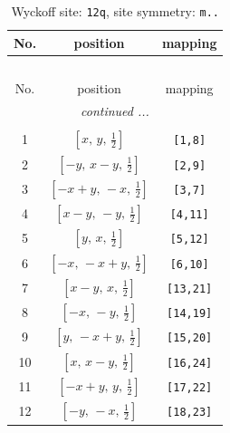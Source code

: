 \documentclass[fleqn,8pt]{jsarticle}
\begin{document}
\begin{longtable}{ccc}
\caption{Wyckoff site: {\tt 12q}, site symmetry: {\tt m..}}
 \\
 \hline \hline
No. & position & mapping \\ \hline \endfirsthead

\multicolumn{2}{l}{\tablename\ \thetable{}} \\
 \hline \hline
No. & position & mapping \\ \hline \endhead

 \hline \hline
\multicolumn{2}{r}{\footnotesize\it continued ...} \\ \endfoot

 \hline \hline
\multicolumn{2}{r}{} \\ \endlastfoot

1 & $\left[ x,\, y,\, \frac{1}{2} \right]$ & {\tt [1,8]} \\ \hline
2 & $\left[ - y,\, x - y,\, \frac{1}{2} \right]$ & {\tt [2,9]} \\ \hline
3 & $\left[ - x + y,\, - x,\, \frac{1}{2} \right]$ & {\tt [3,7]} \\ \hline
4 & $\left[ x - y,\, - y,\, \frac{1}{2} \right]$ & {\tt [4,11]} \\ \hline
5 & $\left[ y,\, x,\, \frac{1}{2} \right]$ & {\tt [5,12]} \\ \hline
6 & $\left[ - x,\, - x + y,\, \frac{1}{2} \right]$ & {\tt [6,10]} \\ \hline
7 & $\left[ x - y,\, x,\, \frac{1}{2} \right]$ & {\tt [13,21]} \\ \hline
8 & $\left[ - x,\, - y,\, \frac{1}{2} \right]$ & {\tt [14,19]} \\ \hline
9 & $\left[ y,\, - x + y,\, \frac{1}{2} \right]$ & {\tt [15,20]} \\ \hline
10 & $\left[ x,\, x - y,\, \frac{1}{2} \right]$ & {\tt [16,24]} \\ \hline
11 & $\left[ - x + y,\, y,\, \frac{1}{2} \right]$ & {\tt [17,22]} \\ \hline
12 & $\left[ - y,\, - x,\, \frac{1}{2} \right]$ & {\tt [18,23]} \\
\end{longtable}
\renewcommand{\arraystretch}{1.2}
\end{document}
